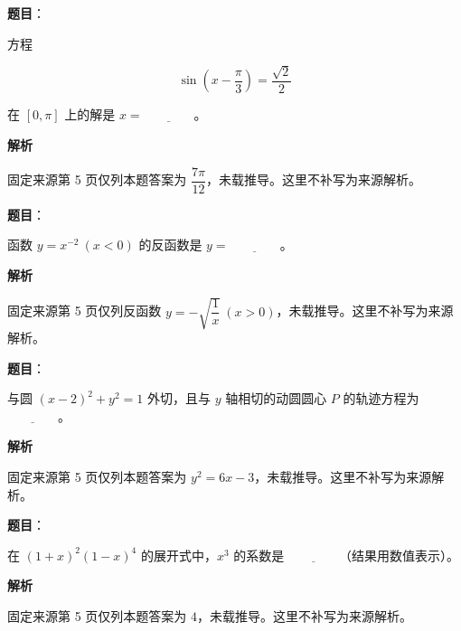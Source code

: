 \begin{answer}

\textbf{题目}：

方程

\nopagebreak[4]
\[
\sin\left(x-\dfrac{\pi}{3}\right)=\dfrac{\sqrt{2}}{2}
\]

在 $[0,\pi]$ 上的解是 $x=\underline{\qquad\qquad}$。

\textbf{解析}

固定来源第 5 页仅列本题答案为 $\dfrac{7\pi}{12}$，未载推导。这里不补写为来源解析。


\end{answer}
\begin{answer}

\textbf{题目}：

函数 $y=x^{-2}\ (x<0)$ 的反函数是 $y=\underline{\qquad\qquad}$。

\textbf{解析}

固定来源第 5 页仅列反函数 $y=-\sqrt{\dfrac1x}\ (x>0)$，未载推导。这里不补写为来源解析。


\end{answer}
\begin{answer}

\textbf{题目}：

与圆 $(x-2)^2+y^2=1$ 外切，且与 $y$ 轴相切的动圆圆心 $P$ 的轨迹方程为 $\underline{\qquad\qquad}$。

\textbf{解析}

固定来源第 5 页仅列本题答案为 $y^2=6x-3$，未载推导。这里不补写为来源解析。


\end{answer}
\begin{answer}

\textbf{题目}：

在 $(1+x)^2(1-x)^4$ 的展开式中，$x^3$ 的系数是 $\underline{\qquad\qquad}$（结果用数值表示）。

\textbf{解析}

固定来源第 5 页仅列本题答案为 $4$，未载推导。这里不补写为来源解析。


\end{answer}
